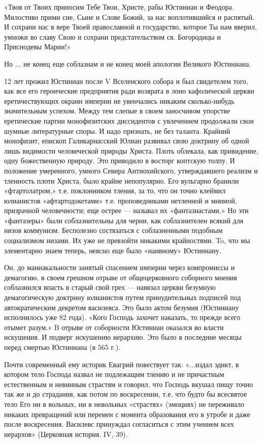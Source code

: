 \documentclass[a4paper,11pt]{extreport}
\begin{document}
«Твоя от Твоих приносим Тебе Твои, Христе, рабы Юстиниан и Феодора. Милостиво
прими сие, Сыне и Слове Божий, за нас воплотившийся и распятый. И сохрани нас в
вере Твоей православной и государство, которое Ты нам вверил, умножи во славу
Свою и сохрани предстательством св. Богородицы и Приснодевы Марии!»

Но ... не конец еще соблазнам и не конец моей апологии Великого Юстиниана.

12 лет прожил Юстиниан после V Вселенского собора и был свидетелем того, как
все его героические предприятия ради возврата в лоно кафолической церкви
еретичествующих окраин империи не увенчались никаким сколько-нибудь
значительным успехом. Между тем слепые в своем заносчивом упорстве еретические
партии монофизитских диссидентов с увлечением продолжали свои шумные
литературные споры. И надо признать, не без таланта. Крайний монофизит, епископ
Галикарнасский Юлиан развивал свою доктрину об одной лишь видимости
человеческой природы Христа. Плоть облекала, как привидение, одну божественную
природу. Это приводило в восторг коптскую толпу. И положение умеренного, умного
Севира Антиохийского, утверждавшего реализм и тленность плоти Христа, было
крайне непопулярно. Его вульгарно бранили «фтартолатром,» т.е. поклонником
тления, за то, что он точно клеймил юлианистов «афтартодокетами» т.е.
проповедниками нетленной и мнимой, призрачной человечности; еще острее ---
называл их «фантазиастами.» Но эти «фантазеры» были соблазнительны для черни,
как соблазнителен всякий для низов коммунизм. Бесполезно состязаться с
соблазненными подобным социализмом низами. Их уже не превзойти никакими
крайностями. To, что мы элементарно знаем теперь, неясно еще было «наивному»
Юстиниану.

Он, до маниакальности занятый спасением империи через компромиссы и демагогию,
в своем грешном отрыве от общецерковного соборного мнения соблазнился впасть в
старый свой грех --- навязал церкви безумную демагогическую доктрину юлианистов
путем принудительных подписей под автократическим декретом василевса. Это было
актом безумия (Юстиниану исполнилось уже 82 года). «Кого Господь захочет
наказать, то прежде всего отымет разум.» B отрыве от соборности Юстиниан
оказался во власти искушения. И подверг искушению иерархию. Это было в
последние месяцы перед смертью Юстиниана (в 565 г.).

Почти современный ему историк Евагрий повествует так: «...издал эдикт, в
котором тело Господа назвал не подлежащим тлению и не причастным естественным и
невинным страстям и говорил, что Господь вкушал пищу точно так же и до
страдания, как потом по воскресении, т.е. что будто бы всесвятое тело Его ни в
вольных, ни в невольных «страстях» (эмоциях) не переживало никаких превращений
или перемен с момента образования его в утробе и даже после воскресения.
Василевс принуждал согласиться с этим учением всех иерархов» (Церковная
история. IV, 39).
\end{document}
